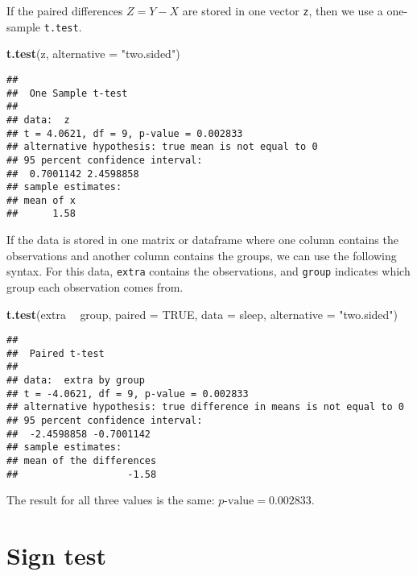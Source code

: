 \documentclass[
]{book}
\newenvironment{Shaded}{\begin{snugshade}}{\end{snugshade}}
\newcommand{\DataTypeTok}[1]{\textcolor[rgb]{0.13,0.29,0.53}{#1}}
\newcommand{\KeywordTok}[1]{\textcolor[rgb]{0.13,0.29,0.53}{\textbf{#1}}}
\newcommand{\NormalTok}[1]{#1}
\newcommand{\OperatorTok}[1]{\textcolor[rgb]{0.81,0.36,0.00}{\textbf{#1}}}
\newcommand{\OtherTok}[1]{\textcolor[rgb]{0.56,0.35,0.01}{#1}}
\newcommand{\StringTok}[1]{\textcolor[rgb]{0.31,0.60,0.02}{#1}}
\begin{document}
If the paired differences \(Z = Y - X\) are stored in one vector
\texttt{z}, then we use a one-sample \texttt{t.test}.

\begin{Shaded}
\begin{Highlighting}[]
\KeywordTok{t.test}\NormalTok{(z, }\DataTypeTok{alternative =} \StringTok{"two.sided"}\NormalTok{)}
\end{Highlighting}
\end{Shaded}

\begin{verbatim}
## 
##  One Sample t-test
## 
## data:  z
## t = 4.0621, df = 9, p-value = 0.002833
## alternative hypothesis: true mean is not equal to 0
## 95 percent confidence interval:
##  0.7001142 2.4598858
## sample estimates:
## mean of x 
##      1.58
\end{verbatim}

If the data is stored in one matrix or dataframe
where one column contains the observations and another column contains the groups,
we can use the following syntax.
For this data, \texttt{extra} contains the observations, and \texttt{group} indicates
which group each observation comes from.

\begin{Shaded}
\begin{Highlighting}[]
\KeywordTok{t.test}\NormalTok{(extra }\OperatorTok{~}\StringTok{ }\NormalTok{group, }\DataTypeTok{paired =} \OtherTok{TRUE}\NormalTok{, }\DataTypeTok{data =}\NormalTok{ sleep, }\DataTypeTok{alternative =} \StringTok{"two.sided"}\NormalTok{)}
\end{Highlighting}
\end{Shaded}

\begin{verbatim}
## 
##  Paired t-test
## 
## data:  extra by group
## t = -4.0621, df = 9, p-value = 0.002833
## alternative hypothesis: true difference in means is not equal to 0
## 95 percent confidence interval:
##  -2.4598858 -0.7001142
## sample estimates:
## mean of the differences 
##                   -1.58
\end{verbatim}

The result for all three values is the same:
\(p\text{-value} = 0.002833\).

\hypertarget{sign-test}{%
\section{Sign test}\label{sign-test}}
\end{document}
